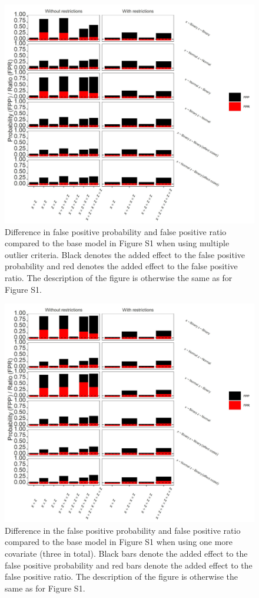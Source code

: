 \begin{figure}[hbt!]
\includegraphics{R/Analysis/Result/Figures/Figure1BSI.jpeg}
\centering
\caption{Difference in false positive probability and false positive ratio compared to the base model in Figure S1 when using multiple outlier criteria. Black denotes the added effect to the false positive probability and red denotes the added effect to the false positive ratio.  The description of the figure is otherwise the same as for Figure S1.}
\label{fig:mainfigure}
\end{figure}

\begin{figure}[hbt!]
\includegraphics{R/Analysis/Result/Figures/Figure1CSI.jpeg}
\centering
\caption{Difference in the false positive probability and false positive ratio compared to the base model in Figure S1 when using one more covariate (three in total). Black bars denote the added effect to the false positive probability and red bars denote the added effect to the false positive ratio. The description of the figure is otherwise the same as for Figure S1.}
\label{fig:mainfigure}
\end{figure}

